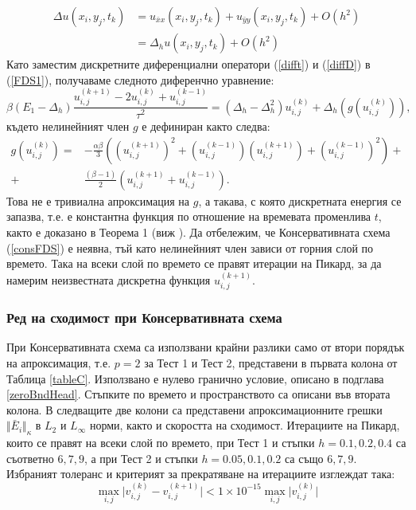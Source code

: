 \documentclass[a4paper]{article}
\newcommand{\be}{\begin{equation}}
\newcommand{\ee}{\end{equation}}
\newcommand{\rf}[1]{(\ref{#1})}
\theoremstyle{remark}
\begin{document}
\begin{large}
\begin{align}\label{diffD}
\Delta u(x_i, y_j, t_k )  &= u_{\bar{x}x}(x_i, y_j, t_k ) +  u_{\bar{y}y}(x_i, y_j, t_k ) +  O(h^2)  \nonumber\\
			      &= \Delta_h u(x_i, y_j, t_k ) +  O(h^2) 
\end{align}
Като заместим дискретните диференциални оператори \rf{difft} и \rf{diffD} в \rf{FDS1}, получаваме следното диференчно уравнение:
\be\label{consFDS}
\beta (E_1-\Delta_h)\frac{ u^{(k+1)}_{i, j} - 2u^{(k)}_{i,j} + u^{(k-1)}_{i,j} }{\tau^2} = (\Delta_h - \Delta_h^2)u^{(k)}_{i,j} + \Delta_h(g(u^{(k)}_{i,j})),
\ee
%
където нелинейният член $g$ е дефиниран както следва:
\begin{align}
g(u^{(k)}_{i,j})=& -\frac{\alpha \beta} { 3 } \left( (u^{(k+1)}_{i,j})^2 + (u^{(k-1)}_{i,j})(u^{(k+1)}_{i,j}) + (u^{(k-1)}_{i,j})^2 \right) + \nonumber\\
+&\frac{ (\beta - 1 )}{ 2 }\left( u^{(k+1)}_{i,j} + u^{(k-1)}_{i,j} \right).
\end{align}
Това не е тривиална апроксимация на $g$, а такава, с която дискретната енергия се запазва, т.е. е константна функция по отношение на времевата променлива $t$, както е доказано в Теорема 1 (виж \cite{ref20}). Да отбележим, че Консервативната схема \rf{consFDS} е неявна, тъй като нелинейният член зависи от горния слой по времето. Така на всеки слой по времето се правят итерации на Пикард, за да намерим неизвестната дискретна функция $u^{(k+1)}_{i,j}$.

\subsubsection{Ред на сходимост при Консервативната схема}\label{convRateCons}
При Консервативната схема са използвани крайни разлики само от втори порядък на апроксимация, т.е. $p=2$ за Тест 1 и Тест 2, представени в първата колона от Таблица \ref{tableC}. Използвано е нулево гранично условие, описано в подглава \ref{zeroBndHead}. Стъпките по времето и пространството са описани във втората колона. В следващите две колони са представени апроксимационните грешки  $\Vert \bar E_i \Vert_\kappa$ в $L_2$ и $L_{\infty}$ норми, както и скоростта на сходимост. Итерациите на Пикард, които се правят на всеки слой по времето, при Тест 1 и стъпки $h=0.1, 0.2, 0.4$ са съответно $6, 7, 9$, а при Тест 2 и стъпки $h=0.05, 0.1, 0.2$ са също $6, 7, 9$. Избраният толеранс и критерият за прекратяване на итерациите изглеждат така:
\be\label{picardCrit}
\max_{i,j} \vert v_{i,j}^{(k)} - v_{i,j}^{(k+1)} \vert < 1 \times 10^{-15} \max_{i,j} \vert v_{i,j}^{(k)} \vert
\ee


\end{large}
\end{document}
